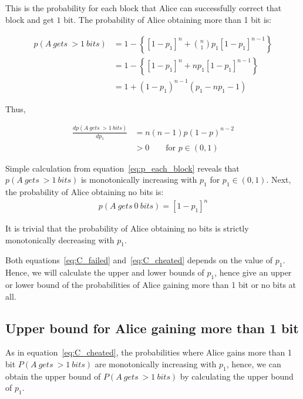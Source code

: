 \documentclass[%
 reprint,
superscriptaddress,
 amsmath,amssymb,
 aps,
]{revtex4-2}
\begin{document}
This is the probability for each block that Alice can successfully correct that block and get $1$ bit. The probability of Alice obtaining more than 1 bit is:

\begin{equation}
\begin{split}
    p(A\ gets\ > 1\ bits) &= 1-\left\{[1-p_1]^n+ \binom{n}{1} p_1[1-p_1]^{n-1}\right\}\\ 
    &= 1-\left\{[1-p_1]^n+np_1[1-p_1]^{n-1}\right\}\\
    &=1 + (1 - p_1)^{n-1} (p_1 - n p_1 - 1)
\end{split}
\label{eq:C_cheated}
\end{equation}

Thus, 

\begin{equation}
\begin{split}
    \frac{dp(A\ gets\ > 1\ bits)}{dp_1}&=n(n-1)p(1 - p)^{n-2}\\
    &>0\qquad \text{for $p\in(0, 1)$}
\end{split}
\end{equation}

Simple calculation from equation~\ref{eq:p_each_block} reveals that $p(A\ gets\ > 1\ bits)$ is monotonically increasing with $p_1$ for $p_1\in(0, 1)$. Next, the probability of Alice obtaining no bits is:
\begin{equation}
\begin{split}
    p(A\ gets\ 0\ bits) =[1-p_1]^n
    \label{eq:C_failed}
\end{split}
\end{equation}

It is trivial that the probability of Alice obtaining no bits is strictly monotonically decreasing with $p_1$.

Both equations~\ref{eq:C_failed} and~\ref{eq:C_cheated} depends on the value of $p_1$. Hence, we will calculate the upper and lower bounds of $p_1$, hence give an upper or lower bound of the probabilities of Alice gaining more than 1 bit or no bits at all.

\subsection{Upper bound for Alice gaining more than 1 bit}
\label{sec:Alice_get_more_info}
As in equation~\ref{eq:C_cheated}, the probabilities where Alice gains more than 1 bit $P(A\ gets\ > 1\ bits)$ are monotonically increasing with $p_1$, hence, we can obtain the upper bound of $P(A\ gets\ > 1\ bits)$ by calculating the upper bound of $p_1$.
\end{document}
